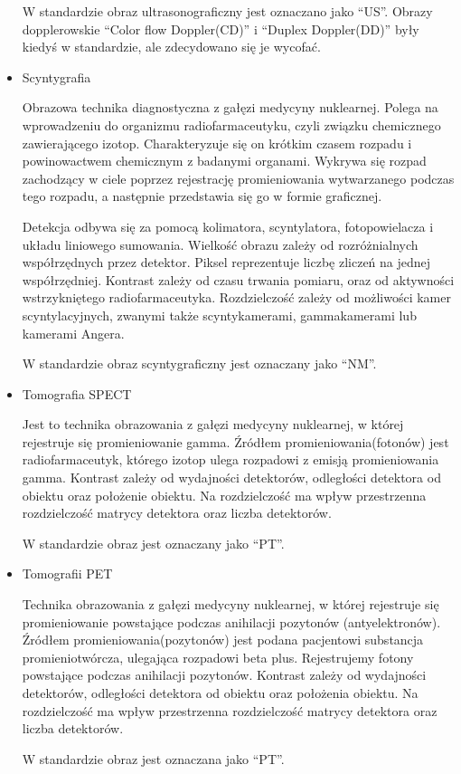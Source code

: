 \begin{itemize}
          W standardzie \DICOM obraz ultrasonograficzny jest oznaczano jako \enquote{US}.
          Obrazy dopplerowskie \enquote{Color flow Doppler(CD)} i \enquote{Duplex Doppler(DD)} były kiedyś w standardzie, ale zdecydowano się je wycofać.

    \item Scyntygrafia

          Obrazowa technika diagnostyczna z gałęzi medycyny nuklearnej.
          Polega na wprowadzeniu do organizmu radiofarmaceutyku, czyli związku chemicznego zawierającego izotop.
          Charakteryzuje się on krótkim czasem rozpadu i powinowactwem chemicznym z badanymi organami.
          Wykrywa się rozpad zachodzący w ciele poprzez rejestrację promieniowania wytwarzanego podczas tego rozpadu, a następnie przedstawia się go w formie graficznej.

          Detekcja odbywa się za pomocą kolimatora, scyntylatora, fotopowielacza i układu liniowego sumowania.
          Wielkość obrazu zależy od rozróżnialnych współrzędnych przez detektor.%
          Piksel reprezentuje liczbę zliczeń na jednej współrzędniej.
          Kontrast zależy od czasu trwania pomiaru, oraz od aktywności wstrzykniętego radiofarmaceutyka.
          Rozdzielczość zależy od możliwości kamer scyntylacyjnych, zwanymi także scyntykamerami, gammakamerami lub kamerami Angera.

          W standardzie \DICOM obraz scyntygraficzny jest oznaczany jako \enquote{NM}.

    \item Tomografia SPECT

          Jest to technika obrazowania z gałęzi medycyny nuklearnej, w której rejestruje się promieniowanie gamma.
          Źródłem promieniowania(fotonów) jest radiofarmaceutyk, którego izotop ulega rozpadowi z emisją promieniowania gamma.
          Kontrast zależy od wydajności detektorów, odległości detektora od obiektu oraz położenie obiektu.
          Na rozdzielczość ma wpływ przestrzenna rozdzielczość matrycy detektora oraz liczba detektorów.

          W standardzie \DICOM obraz jest oznaczany jako \enquote{PT}.

    \item Tomografii PET

          Technika obrazowania  z gałęzi medycyny nuklearnej, w której rejestruje się promieniowanie powstające podczas anihilacji pozytonów (antyelektronów).
          Źródłem promieniowania(pozytonów) jest podana pacjentowi substancja promieniotwórcza, ulegająca rozpadowi beta plus.
          Rejestrujemy fotony powstające podczas anihilacji pozytonów.
          Kontrast zależy od wydajności detektorów, odległości detektora od obiektu oraz położenia obiektu.
          Na rozdzielczość ma wpływ przestrzenna rozdzielczość matrycy detektora oraz liczba detektorów.

          W standardzie \DICOM obraz jest oznaczana jako \enquote{PT}.

\end{itemize}

